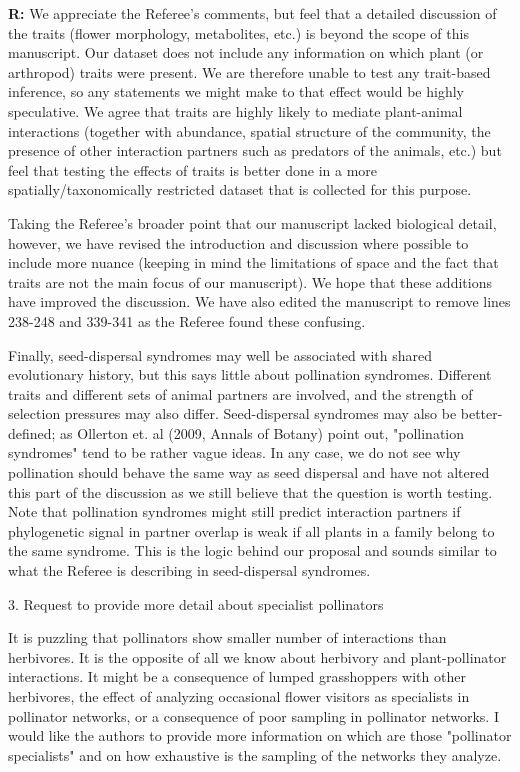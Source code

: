 \documentclass[12pt]{letter}
\newenvironment{refquote}{\bigskip \begin{it}}{\end{it}\smallskip}
\begin{document}
    \textbf{R:} We appreciate the Referee's comments, but feel that a detailed discussion of the traits (flower morphology, metabolites, etc.) is beyond the scope of this manuscript. Our dataset does not include any information on which plant (or arthropod) traits were present. We are therefore unable to test any trait-based inference, so any statements we might make to that effect would be highly speculative. We agree that traits are highly likely to mediate plant-animal interactions (together with abundance, spatial structure of the community, the presence of other interaction partners such as predators of the animals, etc.) but feel that testing the effects of traits is better done in a more spatially/taxonomically restricted dataset that is collected for this purpose.


    Taking the Referee's broader point that our manuscript lacked biological detail, however, we have revised the introduction and discussion where possible to include more nuance (keeping in mind the limitations of space and the fact that traits are not the main focus of our manuscript). We hope that these additions have improved the discussion. We have also edited the manuscript to remove lines 238-248 and 339-341 as the Referee found these confusing.


    Finally, seed-dispersal syndromes may well be associated with shared evolutionary history, but this says little about pollination syndromes. Different traits and different sets of animal partners are involved, and the strength of selection pressures may also differ. Seed-dispersal syndromes may also be better-defined; as Ollerton et. al (2009, Annals of Botany) point out, "pollination syndromes" tend to be rather vague ideas. In any case, we do not see why pollination should behave the same way as seed dispersal and have not altered this part of the discussion as we still believe that the question is worth testing. Note that pollination syndromes might still predict interaction partners if phylogenetic signal in partner overlap is weak if all plants in a family belong to the same syndrome. This is the logic behind our proposal and sounds similar to what the Referee is describing in seed-dispersal syndromes.



  3. Request to provide more detail about specialist pollinators

    \begin{refquote}

      It is puzzling that pollinators show smaller number of interactions than herbivores. It is the opposite of all we know about herbivory and plant-pollinator interactions. It might be a consequence of lumped grasshoppers with other herbivores, the effect of analyzing occasional flower visitors as specialists in pollinator networks, or a consequence of poor sampling in pollinator networks. I would like the authors to provide more information on which are those "pollinator specialists" and on how exhaustive is the sampling of the networks they analyze.

    \end{refquote}
\end{document}
